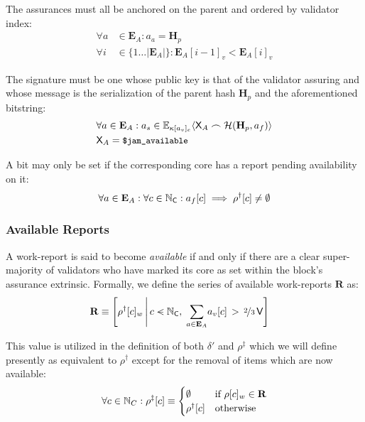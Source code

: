 The assurances must all be anchored on the parent and ordered by validator index:
\begin{align}
  \forall a &\in \mathbf{E}_A : a_a = \mathbf{H}_p \\
  \forall i &\in \{ 1\dots|\mathbf{E}_A| \} : \mathbf{E}_A[i - 1]_v < \mathbf{E}_A[i]_v
\end{align}

The signature must be one whose public key is that of the validator assuring and whose message is the serialization of the parent hash $\mathbf{H}_p$ and the aforementioned bitstring:
\begin{align}
  &\forall a \in \mathbf{E}_A : a_s \in \mathbb{E}_{\kappa[a_v]_e}\langle\mathsf{X}_A\frown \mathcal{H}(\mathbf{H}_p, a_f)\rangle \\
  &\mathsf{X}_A = \text{{\small \texttt{\$jam\_available}}}
\end{align}

A bit may only be set if the corresponding core has a report pending availability on it:
\begin{align}
  \forall a \in \mathbf{E}_A : \forall c \in \mathbb{N}_\mathsf{C} : a_f[c] \implies \rho^\dagger[c] \ne \emptyset
\end{align}

\subsubsection{Available Reports}
A work-report is said to become \emph{available} if and only if there are a clear  super-majority of validators who have marked its core as set within the block's assurance extrinsic. Formally, we define the series of available work-reports $\mathbf{R}$ as:
\begin{align}\label{eq:availableworkreports}
  \mathbf{R} &\equiv \left[\rho^\dagger[c]_w\,\middle\vert\,c \orderedin \N_\mathsf{C},\;\sum_{a \in \mathbf{E}_A}\!a_v[c]\,>\,\nicefrac{2}{3}\,\mathsf{V}\right]
\end{align}

This value is utilized in the definition of both $\delta'$ and $\rho^\ddagger$ which we will define presently as equivalent to $\rho^\dagger$ except for the removal of items which are now available:
\begin{align}
  \forall c \in \mathbb{N}_C: \rho^\ddagger[c] \equiv \begin{cases}
    \emptyset &\text{if }\rho[c]_w \in \mathbf{R}\\
    \rho^\dagger[c] &\text{otherwise}
  \end{cases}
\end{align}











